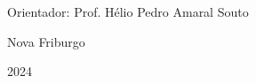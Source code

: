 \begin{titlepage}
    \vspace{1.5cm}

    \begin{flushleft}
        \begin{minipage}{0.5\textwidth}
            \large
            \raggedright
            Orientador: Prof. Hélio Pedro Amaral Souto
        \end{minipage}
    \end{flushleft}


    \vfill %

    {\large Nova Friburgo \par}
    \vspace{0.3cm}
    {\large 2024 \par}
\end{titlepage}
\newpage %
